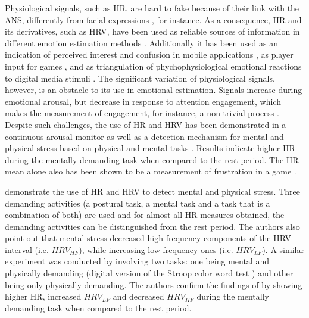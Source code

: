 Physiological signals, such as HR, are hard to fake because of their link with the ANS, differently from facial expressions \parencite{Landowska}, for instance. As a consequence, HR and its derivatives, such as HRV, have been used as reliable sources of information in different emotion estimation methods \parencite{kukolja2014comparative}. Additionally it has been used as an indication of perceived interest and confusion in mobile applications \parencite{xiao2015towards}, as player input for games \parencite{stockhausen2013beats}, and as triangulation of phychophysiological emotional reactions to digital media stimuli \cite{nogueira2015annotation}. The significant variation of physiological signals, however, is an obstacle to its use in emotional estimation. Signals increase during emotional arousal, but decrease in response to attention engagement, which makes the measurement of engagement, for instance, a non-trivial process \parencite{ravaja20051}. Despite such challenges, the use of HR and HRV has been demonstrated in a continuous arousal monitor \parencite{grundlehner2009design} as well as a detection mechanism for mental and physical stress based on physical and mental tasks \parencite{vandeput2009heart,garde2002effects}. Results indicate higher HR during the mentally demanding task when compared to the rest period. The HR mean alone also has been shown to be a measurement of frustration in a game \parencite{rodriguez2015vr}.


\textcite{vandeput2009heart} demonstrate the use of HR and HRV to detect mental and physical stress. Three demanding activities (a postural task, a mental task and a task that is a combination of both) are used and for almost all HR measures obtained, the demanding activities can be distinguished from the rest period. The authors also point out that mental stress decreased high frequency components of the HRV interval (i.e. $HRV_{HF}$), while increasing low frequency ones (i.e. $HRV_{LF}$). A similar experiment was conducted by \textcite{garde2002effects} involving two tasks: one being mental and physically demanding (digital version of the Stroop color word test \parencite{golden1978stroop}) and other being only physically demanding. The authors confirm the findings of \textcite{vandeput2009heart} by showing higher HR, increased $HRV_{LF}$ and decreased $HRV_{HF}$ during the mentally demanding task when compared to the rest period.

